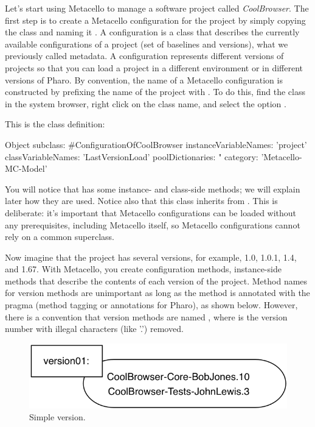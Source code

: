 \documentclass[a4paper,10pt,twoside]{book}
\begin{document}
Let's start using Metacello to manage a software project called \emph{CoolBrowser}. The first step is to create a Metacello configuration for the project by simply copying the class  and naming it . A configuration is a class that describes the currently available configurations of a project (set of baselines and versions), \ie what we previously called metadata. A configuration represents different versions of projects so that you can load a project in a different environment or in different versions of Pharo. 
By convention, the name of a Metacello configuration is constructed by prefixing the name of the project with . To do this, find the class  in the system browser, right click on the class name, and select the option . 

This is the class definition:
\begin{code}{}
Object subclass: #ConfigurationOfCoolBrowser
       instanceVariableNames: 'project'
       classVariableNames: 'LastVersionLoad'
       poolDictionaries: "
       category: 'Metacello-MC-Model'
\end{code}

You will notice that  has some instance- and class-side methods; we will explain later how they are used. Notice also that this class inherits from .  This is deliberate: it's important that Metacello configurations can be loaded without any prerequisites, including Metacello itself, so Metacello configurations cannot rely on a common superclass.

Now imagine that the project  has several versions, for example, 1.0, 1.0.1, 1.4, and 1.67. 
With Metacello, you create configuration methods, instance-side methods that describe the contents of each version of the project. Method names for version methods are unimportant as long as the method is annotated with the  pragma (method tagging or annotations for Pharo), as shown below.  However, there is a  convention that  version methods are named , where  is the version number with illegal characters (like '.') removed.


\begin{figure}
\begin{center}
\includegraphics[width=0.6\linewidth]{version01}
\caption{Simple version.\label{version01}}
\end{center}
\end{figure}
\end{document}
